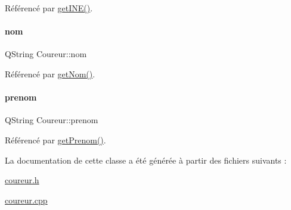 Référencé par \hyperlink{class_coureur_a724d13c5c34757fcd70491da44a918e3}{get\+I\+N\+E()}.

\mbox{\label{class_coureur_ac96ff159efad8a6fd3abbe1a37b51c24}} 
\paragraph{\texorpdfstring{nom}{nom}}
{\footnotesize\ttfamily Q\+String Coureur\+::nom\hspace{0.3cm}{\ttfamily [private]}}



Référencé par \hyperlink{class_coureur_a1808f13910638c6f2a57e87be522adf3}{get\+Nom()}.

\mbox{\label{class_coureur_a5e37d256b17765909423e183879c9e58}} 
\paragraph{\texorpdfstring{prenom}{prenom}}
{\footnotesize\ttfamily Q\+String Coureur\+::prenom\hspace{0.3cm}{\ttfamily [private]}}



Référencé par \hyperlink{class_coureur_a54a92a0fcaf7db9079f9d3f5d043539c}{get\+Prenom()}.



La documentation de cette classe a été générée à partir des fichiers suivants \+:\begin{DoxyCompactItemize}
\item 
\hyperlink{coureur_8h}{coureur.\+h}\item 
\hyperlink{coureur_8cpp}{coureur.\+cpp}\end{DoxyCompactItemize}

